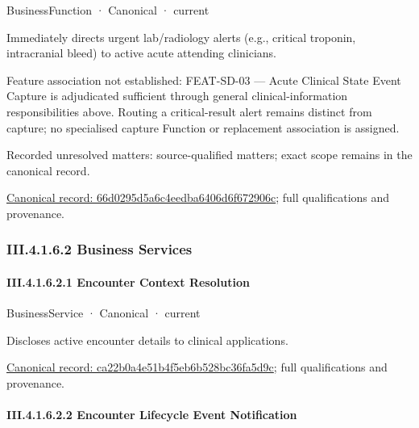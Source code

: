 \label{element:66d0295d5a6c4eedba6406d6f672906c}
{\small BusinessFunction · Canonical · current}\par

Immediately directs urgent lab/radiology alerts (e.g., critical troponin, intracranial bleed) to active acute attending clinicians.



Feature association not established: FEAT-SD-03 — Acute Clinical State Event Capture is adjudicated sufficient through general clinical-information responsibilities above. Routing a critical-result alert remains distinct from capture; no specialised capture Function or replacement association is assigned.


{\small Recorded unresolved matters: source-qualified matters; exact scope remains in the canonical record.}\par
{\footnotesize \href{../../../../continuum/business/business-function/66d0295d5a6c4eedba6406d6f672906c.md}{Canonical record: 66d0295d5a6c4eedba6406d6f672906c}; full qualifications and provenance.}\par
\subsubsection*{III.4.1.6.2 Business Services}
\label{navigation:III.4.1.6.2}

\paragraph*{III.4.1.6.2.1 Encounter Context Resolution}
\label{navigation:III.4.1.6.2.1}

\label{element:ca22b0a4e51b4f5eb6b528bc36fa5d9c}
{\small BusinessService · Canonical · current}\par

Discloses active encounter details to clinical applications.


{\footnotesize \href{../../../../continuum/business/business-service/ca22b0a4e51b4f5eb6b528bc36fa5d9c.md}{Canonical record: ca22b0a4e51b4f5eb6b528bc36fa5d9c}; full qualifications and provenance.}\par
\paragraph*{III.4.1.6.2.2 Encounter Lifecycle Event Notification}
\label{navigation:III.4.1.6.2.2}

